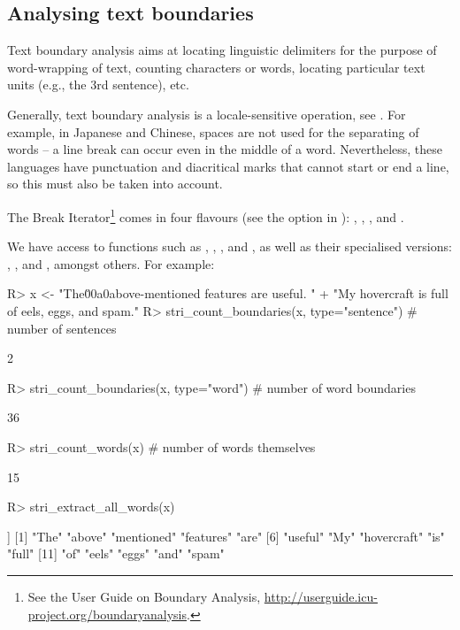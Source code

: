 \documentclass[nojss]{jss}
\begin{document}
\subsection{Analysing text boundaries}\label{Sec:BoundaryAnalysis}

Text boundary analysis aims at locating linguistic delimiters
for the purpose of word-wrapping of text, counting characters or
words, locating particular text units (e.g.,
the 3rd sentence), etc.

Generally, text boundary analysis is a locale-sensitive operation,
see \citep{usa29:segmentation}.
For example, in Japanese and Chinese, spaces are not used for
the separating of words --
a line break can occur even in the middle of a word. Nevertheless,
these languages have punctuation and diacritical marks that cannot
start or end a line, so this must also be taken into account.

The  Break Iterator\footnote{See the  User Guide
on {Boundary Analysis}, \url{http://userguide.icu-project.org/boundaryanalysis}.}
comes in four flavours (see the  option
in ):
, , , and .

We have access to functions such as
,
,
, and
,
as well as their specialised
versions:
,
, and
, amongst others.
For example:


\begin{Schunk}
\begin{Sinput}
R> x <- "The\u00a0above-mentioned    features are useful. " %s+%
+    "My hovercraft is full of eels, eggs, and spam."
R> stri_count_boundaries(x, type="sentence")  # number of sentences
\end{Sinput}
\begin{Soutput}
[1] 2
\end{Soutput}
\begin{Sinput}
R> stri_count_boundaries(x, type="word")  # number of word boundaries
\end{Sinput}
\begin{Soutput}
[1] 36
\end{Soutput}
\begin{Sinput}
R> stri_count_words(x)                    # number of words themselves
\end{Sinput}
\begin{Soutput}
[1] 15
\end{Soutput}
\begin{Sinput}
R> stri_extract_all_words(x)
\end{Sinput}
\begin{Soutput}
[[1]]
 [1] "The"        "above"      "mentioned"  "features"   "are"
 [6] "useful"     "My"         "hovercraft" "is"         "full"
[11] "of"         "eels"       "eggs"       "and"        "spam"
\end{Soutput}
\end{Schunk}
\end{document}
